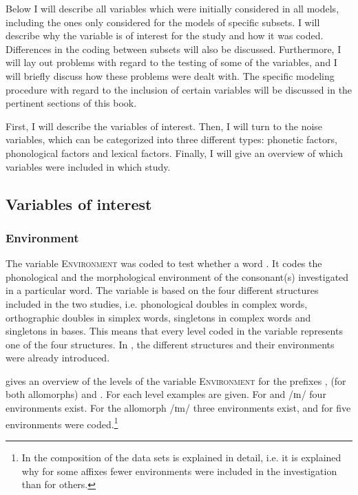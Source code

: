 Below I will describe all variables which were initially considered in all models, including the ones only considered for the models of specific subsets. I will describe why the variable is of interest for the study and how it was coded. Differences in the coding between subsets will also be discussed. Furthermore, I will lay out  problems with regard to the testing of some of the variables, and I will briefly discuss how these problems were dealt with. The specific modeling procedure with regard to the inclusion of certain variables will be discussed in the pertinent sections of this book.

First, I will describe the variables of interest. Then, I will turn to the noise variables, which can be categorized  into three different types: phonetic factors, phonological factors and lexical factors.  Finally, I will give an overview of which variables were included in which study. 

\subsection{Variables of interest} \label{variables of interest}
\subsubsection{Environment}  The variable \textsc{Environment} was coded to test whether a word . It codes the phonological and the morphological environment of the consonant(s) investigated in a particular word. The variable is based on the four different structures included in the two studies,  i.e. phonological doubles in complex words, orthographic doubles in simplex words, singletons in complex words and singletons in bases. This means that every level coded in the variable represents one of the four structures. In , the different structures and their environments were already introduced. %
 
 gives an overview of the levels of the variable \textsc{Environment} for the prefixes ,   (for both allomorphs) and . For each level examples are given.
For  and /ɪn/ four environments exist. For the allomorph /ɪm/ three environments exist, and for  five environments were coded.\footnote{In  the composition of the data sets is explained in detail, i.e. it is explained why for some affixes fewer environments were included in the investigation than for others.}
 

